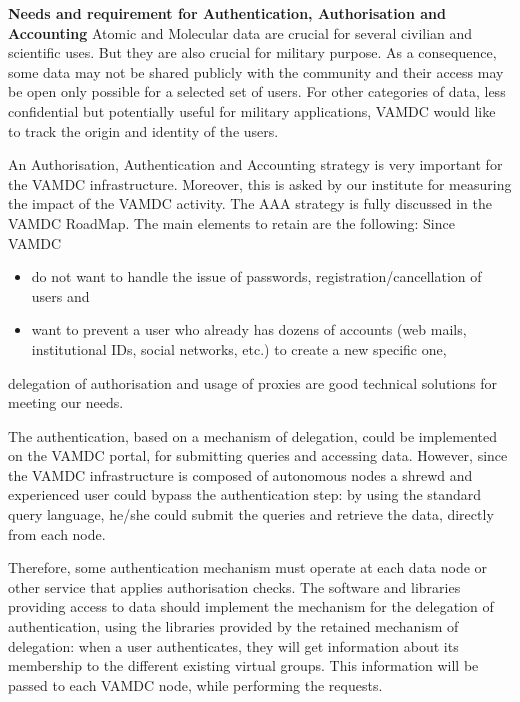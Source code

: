 \documentclass[fleqn,10pt]{wlscirep}
\begin{document}
{\textbf{Needs and requirement for Authentication, Authorisation and Accounting}
Atomic and Molecular data are crucial for several civilian and scientific uses. But they are also crucial for military purpose. As a consequence, some data may not be shared publicly with the community and their access may be open only possible for a selected set of users. For other categories of data, less confidential but potentially useful for military applications, VAMDC would like to track the origin and identity of the users.

An Authorisation, Authentication and Accounting strategy is very important for the VAMDC infrastructure.  Moreover, this is asked by our institute for measuring the impact of the VAMDC activity. The AAA strategy is fully discussed in the VAMDC RoadMap.  The main elements to retain are the following:
Since VAMDC
\begin{itemize}
\item do not want to handle the issue of passwords, registration/cancellation of users and
\item want to prevent a user who already has dozens of accounts (web mails, institutional IDs, social networks, etc.) to create a new specific one,
\end{itemize}
delegation of authorisation and usage of proxies are good technical solutions for meeting our needs.
 
The authentication, based on a mechanism of delegation, could be implemented on the VAMDC portal, for submitting queries and accessing data. However, since the VAMDC infrastructure is composed of autonomous nodes a shrewd and experienced user could bypass the authentication step: by using the standard query language, he/she could submit the queries and retrieve the data, directly from each node.

Therefore, some authentication mechanism must operate at each data node or other service that applies authorisation checks. The software and libraries providing access to data should implement the mechanism for the delegation of authentication, using the libraries provided by the retained mechanism of delegation: when a user authenticates, they will get information about its membership to the different existing virtual groups. This information will be passed to each VAMDC node, while performing the requests.

}
\end{document}
